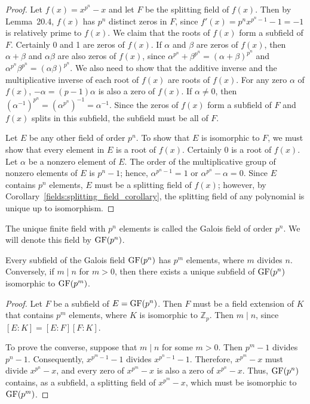  
\begin{proof}
Let $f(x) = x^{p^n} - x$ and let $F$ be the splitting field of $f(x)$.  Then by Lemma~20.4, $f(x)$ has $p^n$ distinct zeros in $F$, since $f'(x) = p^n x^{p^n - 1} - 1 = -1$ is relatively prime to $f(x)$.  We claim that the roots of $f(x)$ form a subfield of $F$.  Certainly 0 and 1 are zeros of $f(x)$.  If $\alpha$ and $\beta$ are zeros of $f(x)$, then $\alpha + \beta$ and $\alpha \beta$ are also zeros of $f(x)$, since $\alpha^{p^n} + \beta^{p^n} =  (\alpha + \beta)^{p^n}$ and $\alpha^{p^n} \beta^{p^n} = (\alpha \beta)^{p^n}$. We also need to show that the additive inverse and the multiplicative inverse of each root of $f(x)$ are roots of $f(x)$.  For any zero $\alpha$ of $f(x)$, $-\alpha = (p - 1)\alpha$ is also a zero of $f(x)$. If $\alpha \neq 0$, then $(\alpha^{-1})^{p^n} = (\alpha^{p^n})^{-1} = \alpha^{-1}$. Since the zeros of $f(x)$ form a subfield of $F$ and $f(x)$ splits in this subfield, the subfield must be all of $F$. 

Let $E$ be any other field of order $p^n$.  To show that $E$ is isomorphic to $F$, we must show that every element in $E$ is a root of $f(x)$.  Certainly 0 is a root of $f(x)$.  Let $\alpha$ be a nonzero element of $E$.  The order of the multiplicative group of nonzero elements of $E$ is $p^n-1$; hence, $\alpha^{p^n-1} =1$ or $\alpha^{p^n} -\alpha = 0$.  Since $E$ contains $p^n$ elements, $E$ must be a splitting field of $f(x)$; however, by Corollary~\ref{fields:splitting_field_corollary}, the splitting field of any polynomial is unique up to isomorphism. 
\end{proof}
 
\medskip

The unique finite field with $p^n$ elements is called the {\bfi Galois field\/} of order $p^n$. We will denote this field by ${\rm GF}(p^n)$\label{galoisfield}. 

\begin{theorem}\label{finite:subfields_theorem}
Every subfield of the Galois field ${\rm GF}(p^n)$ has $p^m$ elements, where $m$ divides $n$.  Conversely, if $m \mid n$ for $m > 0$, then  there exists a unique subfield of ${\rm GF}(p^n)$ isomorphic to  ${\rm GF}(p^m)$.
\end{theorem}

\begin{proof}
Let $F$ be a subfield of $E = {\rm GF}(p^n)$.  Then $F$ must be a field extension of $K$ that contains  $p^m$ elements, where $K$ is isomorphic to ${\mathbb Z}_p$.   Then $m \mid n$, since $[E:K] = [E:F][F:K]$.

To prove the converse, suppose that $m \mid n$ for some $m > 0$.  Then $p^m -1$ divides $p^n -1$. Consequently, $x^{p^m -1} - 1$ divides $x^{p^n -1} -1$. Therefore, $x^{p^m} - x$ must divide $x^{p^n} - x$, and every zero of $x^{p^m} - x$ is also a zero of $x^{p^n} - x$. Thus, ${\rm GF}(p^n)$ contains, as a subfield, a splitting field of $x^{p^m} - x$, which must be isomorphic to ${\rm GF}(p^m)$.
\end{proof}
     

